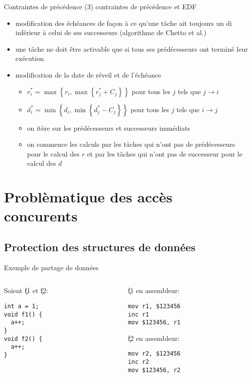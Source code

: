 \begin{frame}{Contraintes de précédence (3)} 
  contraintes de précédence et EDF
  \begin{itemize}
  \item  modification des  échéances de  façon à  ce qu'une  tâche ait
    toujours un di inférieur à celui de ses successeurs (algorithme de
    Chetto et al.)
  \item une tâche ne doit être activable que si tous ses prédécesseurs
    ont terminé leur exécution
  \item modification de la date de réveil et de l'échéance
    \begin{itemize}
    \item $r^*_i = \max \left\{ r_i, \max \left\{ r^*_j + C_j \right\}
      \right\}$ pour tous les $j$ tels que $j → i$
    \item $d^*_i = \min \left\{ d_i, \min \left\{ d^*_j - C_j \right\}
      \right\}$ pour tous les $j$ tels que $i → j$
    \item on itère sur les prédécesseurs et successeurs immédiats
    \item  on commence les  calculs par  les tâches  qui n'ont  pas de
      prédécesseurs pour le calcul des $r$ et par les tâches qui n'ont
      pas de successeur pour le calcul des $d$
    \end{itemize}
  \end{itemize}
\end{frame}

\section{Problèmatique des accès concurents}

\subsection{Protection des structures de données}

\begin{frame}[fragile]{Exemple de partage de données}
  \begin{columns}
    \begin{column}{5cm}
      Soient \c{f1} et \c{f2}:
      \begin{lstlisting}
int a = 1;
void f1() {
  a++;
}
void f2() {
  a++;
}
       \end{lstlisting}
     \end{column}
     \begin{column}{5cm}
       \c{f1} en assembleur:
       \begin{lstlisting}
mov r1, $123456
inc r1
mov $123456, r1
       \end{lstlisting}
       \c{f2} en assembleur:
       \begin{lstlisting} 
mov r2, $123456
inc r2
mov $123456, r2
      \end{lstlisting}
    \end{column}
  \end{columns}
\end{frame} 


